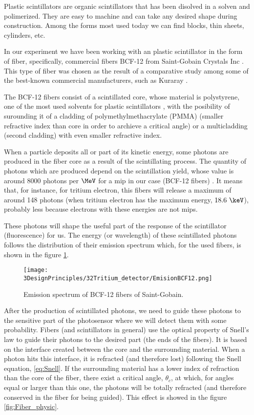 Plastic scintillators are organic scintillators that has been disolved in a solven and polimerized. They are easy to machine and can take any desired shape during construction. Among the forms most used today we can find blocks, thin sheets, cylinders, etc.

In our experiment we have been working with an plastic scintillator in the form of fiber, specifically, commercial fibers BCF-12 from Saint-Gobain Crystals Inc \cite{DataSheetBCF12Fiber}. This type of fiber was chosen as the result of a comparative study among some of the best-known commercial manufacturers, such as Kuraray \cite{DataSheetKuraray}. 

The BCF-12 fibers consist of a scintillated core, whose material is polystyrene, one of the most used solvents for plastic scintillators \cite{Knoll}, with the posibility of surounding it of a cladding of polymethylmethacrylate (PMMA) (smaller refractive index than core in order to archieve a critical angle) or a multicladding (second cladding) with even smaller refractive index.

When a particle deposits all or part of its kinetic energy, some photons are produced in the fiber core as a result of the scintillating process. The quantity of photons which are produced depend on the scintillation yield, whose value is around $8000$ photons per $\MeV$ for a mip in our case (BCF-12 fibers) . It means that, for instance, for tritium electron, this fibers will release a maximum of around 148 photons (when tritium electron has the maximum energy, $18.6~\keV$), probably less because electrons with these energies are not mips.

These photons will shape the useful part of the response of the scintillator (fluorescence) for us. The energy (or wavelength) of these scintillated photons follows the distribution of their emission spectrum which, for the used fibers, is shown in the figure \ref{fig:EmissionSpectrumFibers}.

\begin{figure}[htbp]
\centering
\texttt{[image: 3DesignPrinciples/32Tritium\_detector/EmisionBCF12.png]}
\caption{Emission spectrum of BCF-12 fibers of Saint-Gobain.\label{fig:EmissionSpectrumFibers}~\cite{DataSheetBCF12Fiber}}
\end{figure}

After the production of scintillated photons, we need to guide these photons to the sensitive part of the photosensor where we will detect them with some probability. Fibers (and scintillators in general) use the optical property of Snell's law \cite{Snell} to guide their photons to the desired part (the ends of the fibers). It is based on the interface created between the core and the surrounding material. When a photon hits this interface, it is refracted (and therefore lost) following the Snell equation, \ref{eq:Snell}. If the surrounding material has a lower index of refraction than the core of the fiber, there exist a critical angle, $\theta_c$, at which, for angles equal or larger than this one, the photons will be totally refracted (and therefore conserved in the fiber for being guided). This effect is showed in the figure \ref{fig:Fiber_physic}.

